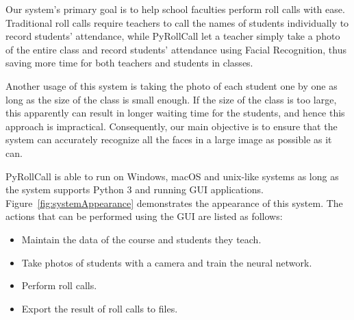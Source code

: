 Our system's primary goal is to help school faculties perform roll calls with ease.
Traditional roll calls require teachers to call the names of students individually to record students' attendance,
while PyRollCall let a teacher simply take a photo of the entire class and record students' attendance
using Facial Recognition, thus saving more time for both teachers and students in classes.
\vspace{0.5cm}

Another usage of this system is taking the photo of each student one by one as long as
the size of the class is small enough. If the size of the class is too large, this apparently
can result in longer waiting time for the students, and hence this approach is impractical.
Consequently, our main objective is to ensure that the system can accurately recognize all the faces
in a large image as possible as it can.
\vspace{0.5cm}

PyRollCall is able to run on Windows, macOS and unix-like systems as long as the system supports
Python 3 and running GUI applications. Figure~\ref{fig:systemAppearance} demonstrates the appearance
of this system. The actions that can be performed using the GUI are listed as follows:
\vspace{0.5cm}

\begin{itemize}
  \item Maintain the data of the course and students they teach.
  \item Take photos of students with a camera and train the neural network.
  \item Perform roll calls.
  \item Export the result of roll calls to files.
\end{itemize}
\setstretch{\myContentLineSpacing}

